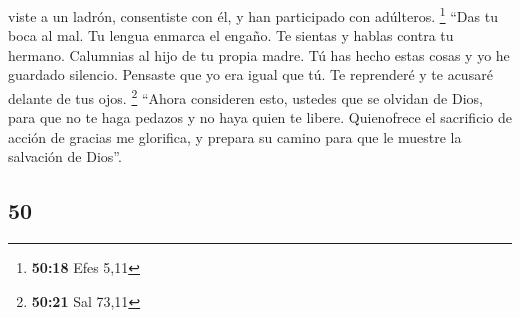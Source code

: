 \begin{paracol}{2}
viste a un ladrón, consentiste con él, y han participado con adúlteros.
\footnote{\textbf{50:18} Efes 5,11}  ``Das tu boca al
mal. Tu lengua enmarca el engaño.  Te sientas y hablas
contra tu hermano. Calumnias al hijo de tu propia madre. 
Tú has hecho estas cosas y yo he guardado silencio. Pensaste que yo era
igual que tú. Te reprenderé y te acusaré delante de tus ojos.
\footnote{\textbf{50:21} Sal 73,11}  ``Ahora consideren
esto, ustedes que se olvidan de Dios, para que no te haga pedazos y no
haya quien te libere.  Quienofrece el sacrificio de
acción de gracias me glorifica, y prepara su camino para que le muestre
la salvación de Dios''.

\switchcolumn
\begin{otherlanguage}{english}

\hypertarget{section-99}{%
\section{50}\label{section-99}}


\end{otherlanguage}
\end{paracol}
